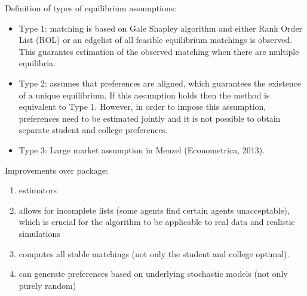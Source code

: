Definition of types of equilibrium assumptions:
\begin{itemize}
 \item Type 1: matching is based on Gale Shapley algorithm and either Rank Order List (ROL) or an edgelist of all feasible equilibrium matchings is observed. This guarantes estimation of the observed matching when there are multiple equilibria.
 \item Type 2: assumes that preferences are aligned, which guarantees the existence of a unique equilibrium. If this assumption holds then the method is equivalent to Type 1. However, in order to impose this assumption, preferences need to be estimated jointly and it is not possible to obtain separate student and college preferences.
 \item Type 3: Large market assumption in Menzel (Econometrica, 2013).
\end{itemize}

Improvements over  package:
\begin{enumerate}
 \item estimators
 \item allows for incomplete lists (some agents find certain agents unacceptable), which is crucial for the algorithm to be applicable to real data and realistic simulations
 \item computes all stable matchings (not only the student and college optimal).
 \item can generate preferences based on underlying stochastic models (not only purely random)
\end{enumerate}


